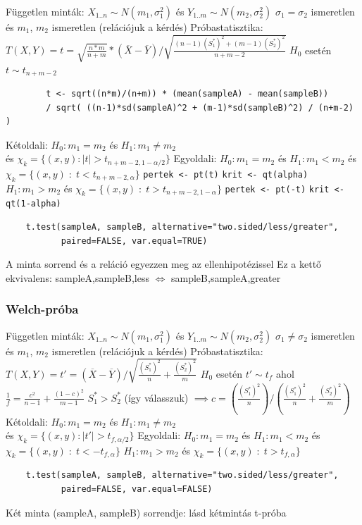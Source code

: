 \documentclass[12pt,a4paper]{article}
\begin{document}
\begin{outline}
	\1 Független minták: $X_{1..n} \sim N(m_1, \sigma_1^2)$ és $Y_{1..m} \sim N(m_2, \sigma_2^2)$
		\2 $\sigma_1 = \sigma_2$ ismeretlen és $m_1$, $m_2$ ismeretlen (relációjuk a kérdés)
	\1 Próbastatisztika: $T(X,Y) = t = \sqrt{\frac{n*m}{n+m}} * (\overline{X} - \overline{Y}) / \sqrt{\frac{(n-1)(S^*_1)^2+(m-1)(S^*_2)^2}{n+m-2}}$
		\2 $H_0$ esetén $t \sim t_{n+m-2}$
		\2 \begin{verbatim}
		t <- sqrt((n*m)/(n+m)) * (mean(sampleA) - mean(sampleB))
		/ sqrt( ((n-1)*sd(sampleA)^2 + (m-1)*sd(sampleB)^2) / (n+m-2) )
		\end{verbatim}
	\1 Kétoldali: $H_0: m_1 = m_2$ és $H_1: m_1 \ne m_2$\\
	és $\chi_k = \{ (x,y) : |t| > t_{n+m-2,1-\alpha/2} \}$
	\1 Egyoldali: $H_0: m_1 = m_2$ és 
		\2 $H_1: m_1 < m_2$ és $\chi_k = \{ (x,y) \;:\; t < t_{n+m-2,\alpha} \}$
			\3 \texttt{pertek <- pt(t)}
			\3 \texttt{krit <- qt(alpha)}
		\2 $H_1: m_1 > m_2$ és $\chi_k = \{ (x,y) \;:\; t > t_{n+m-2,1-\alpha} \}$
			\3 \texttt{pertek <- pt(-t)}
			\3 \texttt{krit <- qt(1-alpha)}
	\1 \begin{verbatim}
	t.test(sampleA, sampleB, alternative="two.sided/less/greater",
	       paired=FALSE, var.equal=TRUE)
	\end{verbatim}
		\2 A minta sorrend és a reláció egyezzen meg az ellenhipotézissel
		\2 Ez a kettő ekvivalens: sampleA,sampleB,less $\Leftrightarrow$ sampleB,sampleA,greater
\end{outline}

\pagebreak

\subsubsection{Welch-próba}
\label{sec:próba-welch}

\begin{outline}
	\1 Független minták: $X_{1..n} \sim N(m_1, \sigma_1^2)$ és $Y_{1..m} \sim N(m_2, \sigma_2^2)$
		\2 $\sigma_1 \ne \sigma_2$ ismeretlen és $m_1$, $m_2$ ismeretlen (relációjuk a kérdés)
	\1 Próbastatisztika: $T(X,Y) = t' = (\overline{X} - \overline{Y}) / \sqrt{\frac{(S^*_1)^2}{n}+\frac{(S^*_2)^2}{m}}$
		\2 $H_0$ esetén $t' \sim t_f$
		ahol $\frac{1}{f} = \frac{c^2}{n-1} + \frac{(1-c)^2}{m-1}$
		\2 $S^*_1 > S^*_2$ (így válasszuk) $\implies
		c = (\frac{(S^*_1)^2}{n}) / ( \frac{(S^*_1)^2}{n} + \frac{(S^*_2)^2}{m} )$
	\1 Kétoldali: $H_0: m_1 = m_2$ és $H_1: m_1 \ne m_2$\\
	és $\chi_k = \{ (x,y) : |t'| > t_{f,\alpha/2} \}$
	\1 Egyoldali: $H_0: m_1 = m_2$ és 
		\2 $H_1: m_1 < m_2$ és $\chi_k = \{ (x,y) \;:\; t < -t_{f,\alpha} \}$
		\2 $H_1: m_1 > m_2$ és $\chi_k = \{ (x,y) \;:\; t > t_{f,\alpha} \}$
	\1 \begin{verbatim}
	t.test(sampleA, sampleB, alternative="two.sided/less/greater",
	       paired=FALSE, var.equal=FALSE)
	\end{verbatim}
		\2 Két minta (sampleA, sampleB) sorrendje: lásd kétmintás t-próba
\end{outline}
\end{document}
